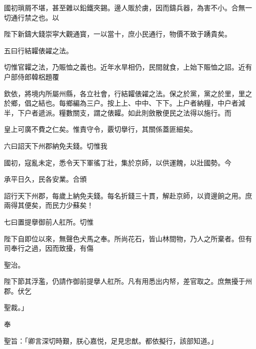 \begin{myquote}[\markfont]
國初瑣屑不堪，甚至雜以鉛鐵夾錫。邊人販於虜，因而鑄兵器，為害不小。合無一切通行禁之也。以

陛下新鑄大錢崇寜大觀通寳，一以當十，庶小民通行，物價不致于踴貴矣。

\hspace*{2em}五曰行結糶俵糴之法。

切惟官糶之法，乃賑恤之義也。近年水旱相仍，民間就食，上始下賑恤之詔。近有户部侍郎韓梠題覆

欽依，將境内所屬州縣，各立社會，行結糶俵糴之法。保之於黨，黨之於里，里之於鄉，倡之結也。每鄉編為三户。按上上、中中、下下。上户者納糧，中户者減半，下户者遞派。糧數關支，謂之俵糶。如此則斂散便民之法得以施行。而

皇上可廣不費之仁矣。惟責守令，覈切擧行，其關係蓋匪細矣。

\hspace*{2em}六曰詔天下州郡納免夫錢。切惟我

國初，寇亂未定，悉令天下軍徭丁壯，集於京師，以供運餽，以壯國勢。今

承平日久，民各安業。合頒

詔行天下州郡，每歲上納免夫錢。每名折錢三十貫，解赴京師，以資邊餉之用。庶兩得其便矣，而民力少蘇矣！

\hspace*{2em}七曰置提擧御前人舡所。切惟

陛下自即位以來，無聲色犬馬之奉。所尚花石，皆山林間物，乃人之所棄者。但有司奉行之過，因而致擾，有傷

聖治。

陛下節其浮濫，仍請作御前提擧人舡所。凡有用悉出内帑，差官取之。庶無擾于州郡。伏乞

聖裁。」

奉

聖旨：「卿言深切時艱，朕心嘉悦，足見忠猷。都依擬行，該部知道。」
\end{myquote}

